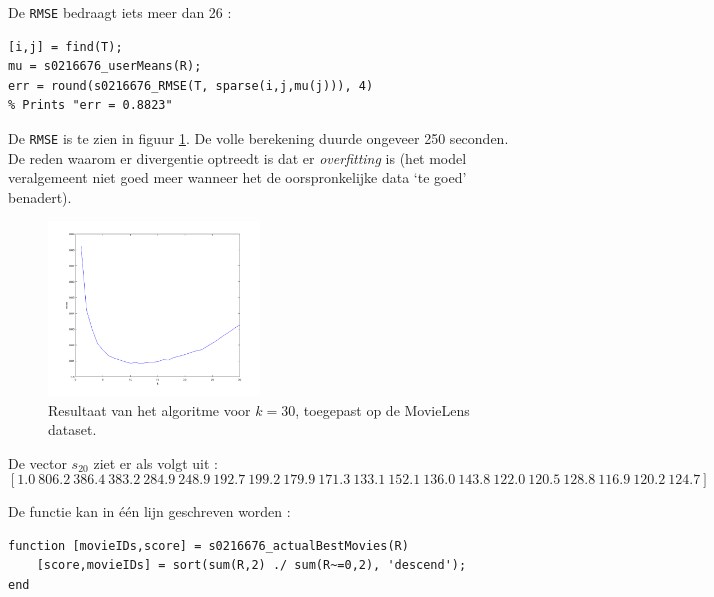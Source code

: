 De \texttt{RMSE} bedraagt iets meer dan 26 :

\begin{lstlisting}
[i,j] = find(T);
mu = s0216676_userMeans(R);
err = round(s0216676_RMSE(T, sparse(i,j,mu(j))), 4)
% Prints "err = 0.8823"
\end{lstlisting}



De \texttt{RMSE} is te zien in figuur \ref{fig:op12}. De volle berekening duurde ongeveer 250 seconden. De reden waarom er divergentie optreedt is dat er \textit{overfitting} is (het model veralgemeent niet goed meer wanneer het de oorspronkelijke data `te goed' benadert).

\begin{figure}[H]
\centering
\includegraphics[width=0.5\textwidth]{res/op12.png}
\caption{Resultaat van het algoritme voor $k=30$, toegepast op de MovieLens dataset.}
\label{fig:op12}
\end{figure}



De vector $s_{20}$ ziet er als volgt uit :
$$[1.0\ 806.2\ 386.4\ 383.2\ 284.9\ 248.9\ 192.7\ 199.2\ 179.9\ 171.3\ 133.1\ 152.1\ 136.0\ 143.8\ 122.0\ 120.5\ 128.8\ 116.9\ 120.2\ 124.7]$$



De functie kan in \'e\'en lijn geschreven worden :

\begin{lstlisting}
function [movieIDs,score] = s0216676_actualBestMovies(R)
    [score,movieIDs] = sort(sum(R,2) ./ sum(R~=0,2), 'descend');
end
\end{lstlisting}



